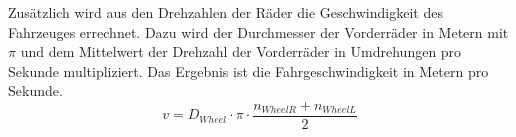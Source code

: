 Zusätzlich wird aus den Drehzahlen der Räder die Geschwindigkeit des Fahrzeuges errechnet. Dazu wird der Durchmesser der Vorderräder in Metern mit $\pi$ und dem Mittelwert der Drehzahl der Vorderräder in Umdrehungen pro Sekunde multipliziert. Das Ergebnis ist die Fahrgeschwindigkeit in Metern pro Sekunde.
\begin{equation}
v=D_{Wheel}\cdot\pi\cdot\frac{n_{WheelR}+n_{WheelL}}{2}
\label{eqn:velocity}
\end{equation}


